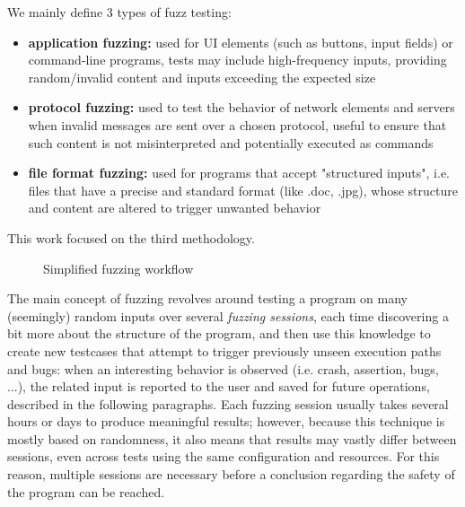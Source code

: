 We mainly define 3 types of fuzz testing:
\begin{itemize}
    \item \textbf{application fuzzing:} used for UI elements (such as buttons, input fields) or command-line programs, tests may include high-frequency inputs, providing random/invalid content and inputs exceeding the expected size
    \item \textbf{protocol fuzzing:} used to test the behavior of network elements and servers when invalid messages are sent over a chosen protocol, useful to ensure that such content is not misinterpreted and potentially executed as commands
    \item  \textbf{file format fuzzing:} used for programs that accept "structured inputs", i.e. files that have a precise and standard format (like .doc, .jpg), whose structure and content are altered to trigger unwanted behavior
\end{itemize}

This work focused on the third methodology.

\newpage
\begin{figure}[h]
\caption{Simplified fuzzing workflow}
\label{fig:fuzzer_workflow}
\end{figure}

The main concept of fuzzing revolves around testing a program on many (seemingly) random inputs over several \textit{fuzzing sessions}, each time discovering a bit more about the structure of the program, and then use this knowledge to create new testcases that attempt to trigger previously unseen execution paths and bugs: when an interesting behavior is observed (i.e. crash, assertion, bugs, ...), the related input is reported to the user and saved for future operations, described in the following paragraphs. 
Each fuzzing session usually takes several hours or days to produce meaningful results; however, because this technique is mostly based on randomness, it also means that results may vastly differ between sessions, even across tests using the same configuration and resources. For this reason, multiple sessions are necessary before a conclusion regarding the safety of the program can be reached.

